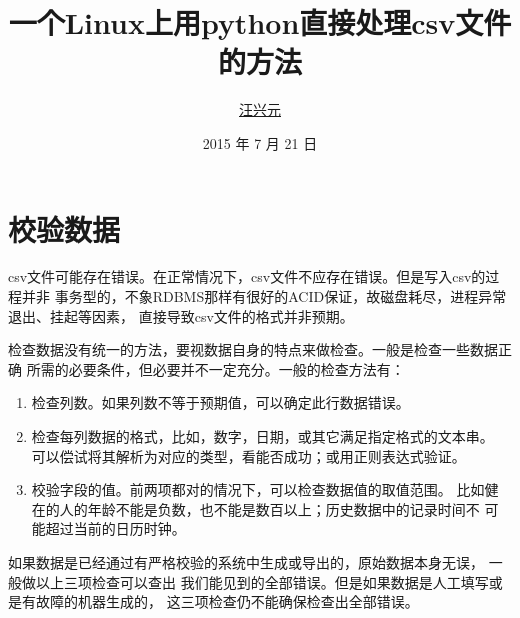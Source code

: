\documentclass[11pt]{article}
\begin{document}
\title{一个Linux上用python直接处理csv文件的方法}
\author{\href{mailto:xtwxy@hotmail.com}{汪兴元}}
\date{2015 年 7 月 21 日}
\maketitle
{}

\tableofcontents

\section{校验数据}
csv文件可能存在错误。在正常情况下，csv文件不应存在错误。但是写入csv的过程并非
事务型的，不象RDBMS那样有很好的ACID保证，故磁盘耗尽，进程异常退出、挂起等因素，
直接导致csv文件的格式并非预期。

检查数据没有统一的方法，要视数据自身的特点来做检查。一般是检查一些数据正确
所需的必要条件，但必要并不一定充分。一般的检查方法有：
\begin{enumerate}
  \item 检查列数。如果列数不等于预期值，可以确定此行数据错误。
  \item 检查每列数据的格式，比如，数字，日期，或其它满足指定格式的文本串。
    可以偿试将其解析为对应的类型，看能否成功；或用正则表达式验证。
  \item 校验字段的值。前两项都对的情况下，可以检查数据值的取值范围。
    比如健在的人的年龄不能是负数，也不能是数百以上；历史数据中的记录时间不
    可能超过当前的日历时钟。 
\end{enumerate}

如果数据是已经通过有严格校验的系统中生成或导出的，原始数据本身无误，
一般做以上三项检查可以查出
我们能见到的全部错误。但是如果数据是人工填写或是有故障的机器生成的，
这三项检查仍不能确保检查出全部错误。
\end{document}

